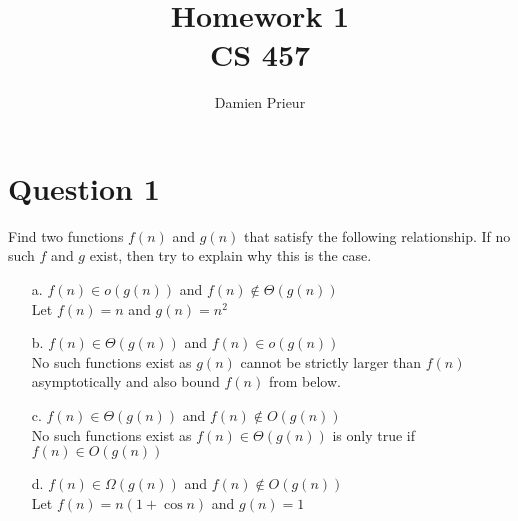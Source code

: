 \documentclass{article}
\author{Damien Prieur}
\title{Homework 1 \\ CS 457}
\date{}
\begin{document}
\maketitle

\section*{Question 1}
Find two functions $f(n)$ and $g(n)$ that satisfy the following relationship. If no such $f$ and $g$ exist, then try to explain why this is the case.
\begin{enumerate}
\item[a.] $f(n) \in o(g(n))$ and $f(n) \notin \Theta (g(n))$ \\ Let $f(n)=n$ and $g(n)=n^2$

\item[b.] $f(n) \in \Theta (g(n))$ and $f(n) \in o(g(n))$ \\ No such functions exist as $g(n)$ cannot be strictly larger than $f(n)$ asymptotically and also bound $f(n)$ from below.

\item[c.] $f(n) \in \Theta (g(n))$ and $f(n) \notin O(g(n))$ \\ No such functions exist as $f(n) \in \Theta (g(n))$ is only true if $f(n) \in O(g(n))$

\item[d.] $f(n) \in \Omega (g(n))$ and $f(n) \notin O(g(n))$ \\ Let $f(n)=n (1+\cos n)$ and $g(n)=1$

\end{enumerate}
\end{document}
